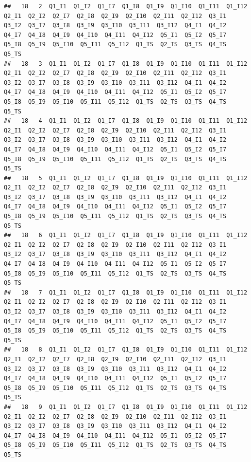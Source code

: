 \documentclass[]{book}
\begin{document}
\begin{verbatim}
##   18   2  Q1_I1  Q1_I2  Q1_I7  Q1_I8  Q1_I9  Q1_I10  Q1_I11  Q1_I12  Q2_I1  Q2_I2  Q2_I7  Q2_I8  Q2_I9  Q2_I10  Q2_I11  Q2_I12  Q3_I1  Q3_I2  Q3_I7  Q3_I8  Q3_I9  Q3_I10  Q3_I11  Q3_I12  Q4_I1  Q4_I2  Q4_I7  Q4_I8  Q4_I9  Q4_I10  Q4_I11  Q4_I12  Q5_I1  Q5_I2  Q5_I7  Q5_I8  Q5_I9  Q5_I10  Q5_I11  Q5_I12  Q1_TS  Q2_TS  Q3_TS  Q4_TS  Q5_TS
##   18   3  Q1_I1  Q1_I2  Q1_I7  Q1_I8  Q1_I9  Q1_I10  Q1_I11  Q1_I12  Q2_I1  Q2_I2  Q2_I7  Q2_I8  Q2_I9  Q2_I10  Q2_I11  Q2_I12  Q3_I1  Q3_I2  Q3_I7  Q3_I8  Q3_I9  Q3_I10  Q3_I11  Q3_I12  Q4_I1  Q4_I2  Q4_I7  Q4_I8  Q4_I9  Q4_I10  Q4_I11  Q4_I12  Q5_I1  Q5_I2  Q5_I7  Q5_I8  Q5_I9  Q5_I10  Q5_I11  Q5_I12  Q1_TS  Q2_TS  Q3_TS  Q4_TS  Q5_TS
##   18   4  Q1_I1  Q1_I2  Q1_I7  Q1_I8  Q1_I9  Q1_I10  Q1_I11  Q1_I12  Q2_I1  Q2_I2  Q2_I7  Q2_I8  Q2_I9  Q2_I10  Q2_I11  Q2_I12  Q3_I1  Q3_I2  Q3_I7  Q3_I8  Q3_I9  Q3_I10  Q3_I11  Q3_I12  Q4_I1  Q4_I2  Q4_I7  Q4_I8  Q4_I9  Q4_I10  Q4_I11  Q4_I12  Q5_I1  Q5_I2  Q5_I7  Q5_I8  Q5_I9  Q5_I10  Q5_I11  Q5_I12  Q1_TS  Q2_TS  Q3_TS  Q4_TS  Q5_TS
##   18   5  Q1_I1  Q1_I2  Q1_I7  Q1_I8  Q1_I9  Q1_I10  Q1_I11  Q1_I12  Q2_I1  Q2_I2  Q2_I7  Q2_I8  Q2_I9  Q2_I10  Q2_I11  Q2_I12  Q3_I1  Q3_I2  Q3_I7  Q3_I8  Q3_I9  Q3_I10  Q3_I11  Q3_I12  Q4_I1  Q4_I2  Q4_I7  Q4_I8  Q4_I9  Q4_I10  Q4_I11  Q4_I12  Q5_I1  Q5_I2  Q5_I7  Q5_I8  Q5_I9  Q5_I10  Q5_I11  Q5_I12  Q1_TS  Q2_TS  Q3_TS  Q4_TS  Q5_TS
##   18   6  Q1_I1  Q1_I2  Q1_I7  Q1_I8  Q1_I9  Q1_I10  Q1_I11  Q1_I12  Q2_I1  Q2_I2  Q2_I7  Q2_I8  Q2_I9  Q2_I10  Q2_I11  Q2_I12  Q3_I1  Q3_I2  Q3_I7  Q3_I8  Q3_I9  Q3_I10  Q3_I11  Q3_I12  Q4_I1  Q4_I2  Q4_I7  Q4_I8  Q4_I9  Q4_I10  Q4_I11  Q4_I12  Q5_I1  Q5_I2  Q5_I7  Q5_I8  Q5_I9  Q5_I10  Q5_I11  Q5_I12  Q1_TS  Q2_TS  Q3_TS  Q4_TS  Q5_TS
##   18   7  Q1_I1  Q1_I2  Q1_I7  Q1_I8  Q1_I9  Q1_I10  Q1_I11  Q1_I12  Q2_I1  Q2_I2  Q2_I7  Q2_I8  Q2_I9  Q2_I10  Q2_I11  Q2_I12  Q3_I1  Q3_I2  Q3_I7  Q3_I8  Q3_I9  Q3_I10  Q3_I11  Q3_I12  Q4_I1  Q4_I2  Q4_I7  Q4_I8  Q4_I9  Q4_I10  Q4_I11  Q4_I12  Q5_I1  Q5_I2  Q5_I7  Q5_I8  Q5_I9  Q5_I10  Q5_I11  Q5_I12  Q1_TS  Q2_TS  Q3_TS  Q4_TS  Q5_TS
##   18   8  Q1_I1  Q1_I2  Q1_I7  Q1_I8  Q1_I9  Q1_I10  Q1_I11  Q1_I12  Q2_I1  Q2_I2  Q2_I7  Q2_I8  Q2_I9  Q2_I10  Q2_I11  Q2_I12  Q3_I1  Q3_I2  Q3_I7  Q3_I8  Q3_I9  Q3_I10  Q3_I11  Q3_I12  Q4_I1  Q4_I2  Q4_I7  Q4_I8  Q4_I9  Q4_I10  Q4_I11  Q4_I12  Q5_I1  Q5_I2  Q5_I7  Q5_I8  Q5_I9  Q5_I10  Q5_I11  Q5_I12  Q1_TS  Q2_TS  Q3_TS  Q4_TS  Q5_TS
##   18   9  Q1_I1  Q1_I2  Q1_I7  Q1_I8  Q1_I9  Q1_I10  Q1_I11  Q1_I12  Q2_I1  Q2_I2  Q2_I7  Q2_I8  Q2_I9  Q2_I10  Q2_I11  Q2_I12  Q3_I1  Q3_I2  Q3_I7  Q3_I8  Q3_I9  Q3_I10  Q3_I11  Q3_I12  Q4_I1  Q4_I2  Q4_I7  Q4_I8  Q4_I9  Q4_I10  Q4_I11  Q4_I12  Q5_I1  Q5_I2  Q5_I7  Q5_I8  Q5_I9  Q5_I10  Q5_I11  Q5_I12  Q1_TS  Q2_TS  Q3_TS  Q4_TS  Q5_TS

\end{verbatim}
\end{document}
